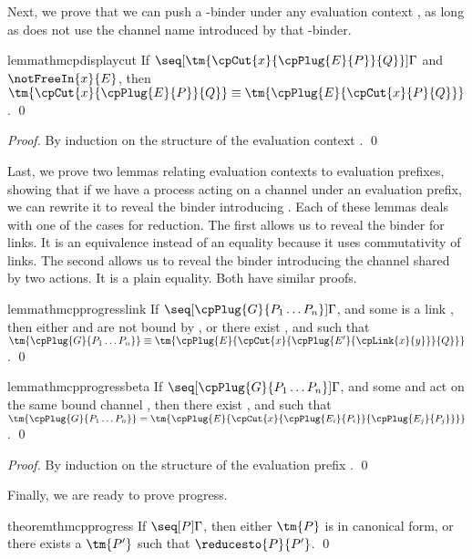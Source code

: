 \documentclass[UKenglish]{llncs}
\begin{document}
Next, we prove that we can push a \textnu-binder under any evaluation context
, as long as  does not use the channel name introduced by that
\textnu-binder.
\begin{restatable}{lemma}{thmcpdisplaycut}\label{thm:cp-display-cut}
  If $\seq[{ \tm{\cpCut{x}{\cpPlug{E}{P}}{Q}} }]{ \Gamma }$ and
  $\notFreeIn{x}{E}$, then $\tm{\cpCut{x}{\cpPlug{E}{P}}{Q}} \equiv
  \tm{\cpPlug{E}{\cpCut{x}{P}{Q}}}$. 
  \qed
\end{restatable}
\begin{proof}
  By induction on the structure of the evaluation context .
  \qed
\end{proof}
Last, we prove two lemmas relating evaluation contexts to evaluation prefixes,
showing that if we have a process acting on a channel  under an evaluation
prefix, we can rewrite it to reveal the binder introducing .
Each of these lemmas deals with one of the cases for reduction.
The first allows us to reveal the binder for links.
It is an equivalence instead of an equality because it uses commutativity of
links. 
The second allows us to reveal the binder introducing the channel shared by two
actions. It is a plain equality.
Both have similar proofs.
\begin{restatable}{lemma}{thmcpprogresslink}\label{thm:cp-progress-link}
  If $\seq[{ \cpPlug{G}{P_1 \dots P_n} }]{ \Gamma }$, and some  is a
  link , then either  and  are not bound by
  , or there exist ,  and  such that
  \(
  \tm{\cpPlug{G}{P_1 \dots P_n}} \equiv
  \tm{\cpPlug{E}{\cpCut{x}{\cpPlug{E'}{\cpLink{x}{y}}}{Q}}}
  \).
  \qed
\end{restatable}
\begin{restatable}{lemma}{thmcpprogressbeta}\label{thm:cp-progress-beta}
  If $\seq[{ \cpPlug{G}{P_1 \dots P_n} }]{ \Gamma }$, and some  and
   act on the same bound channel , then there exist ,
   and  such that
  \(
  \tm{\cpPlug{G}{P_1 \dots P_n}} =
  \tm{\cpPlug{E}{\cpCut{x}{\cpPlug{E_i}{P_i}}{\cpPlug{E_j}{P_j}}}}
  \).
  \qed
\end{restatable}
\begin{proof}
  By induction on the structure of the evaluation prefix .
  \qed
\end{proof}
Finally, we are ready to prove progress.
\begin{restatable}[Progress]{theorem}{thmcpprogress}\label{thm:cp-progress}
  If $\seq[{ P }]{ \Gamma }$, then either $\tm{P}$ is in canonical form, or
  there exists a $\tm{P'}$ such that $\reducesto{P}{P'}$. 
  \qed
\end{restatable}
\end{document}
